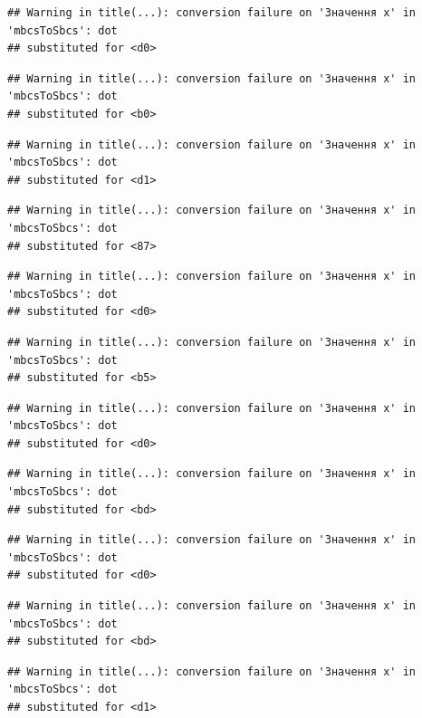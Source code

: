 \documentclass[
  11pt,
]{book}
\begin{document}
\begin{verbatim}
## Warning in title(...): conversion failure on 'Значення x' in 'mbcsToSbcs': dot
## substituted for <d0>
\end{verbatim}

\begin{verbatim}
## Warning in title(...): conversion failure on 'Значення x' in 'mbcsToSbcs': dot
## substituted for <b0>
\end{verbatim}

\begin{verbatim}
## Warning in title(...): conversion failure on 'Значення x' in 'mbcsToSbcs': dot
## substituted for <d1>
\end{verbatim}

\begin{verbatim}
## Warning in title(...): conversion failure on 'Значення x' in 'mbcsToSbcs': dot
## substituted for <87>
\end{verbatim}

\begin{verbatim}
## Warning in title(...): conversion failure on 'Значення x' in 'mbcsToSbcs': dot
## substituted for <d0>
\end{verbatim}

\begin{verbatim}
## Warning in title(...): conversion failure on 'Значення x' in 'mbcsToSbcs': dot
## substituted for <b5>
\end{verbatim}

\begin{verbatim}
## Warning in title(...): conversion failure on 'Значення x' in 'mbcsToSbcs': dot
## substituted for <d0>
\end{verbatim}

\begin{verbatim}
## Warning in title(...): conversion failure on 'Значення x' in 'mbcsToSbcs': dot
## substituted for <bd>
\end{verbatim}

\begin{verbatim}
## Warning in title(...): conversion failure on 'Значення x' in 'mbcsToSbcs': dot
## substituted for <d0>
\end{verbatim}

\begin{verbatim}
## Warning in title(...): conversion failure on 'Значення x' in 'mbcsToSbcs': dot
## substituted for <bd>
\end{verbatim}

\begin{verbatim}
## Warning in title(...): conversion failure on 'Значення x' in 'mbcsToSbcs': dot
## substituted for <d1>
\end{verbatim}
\end{document}

